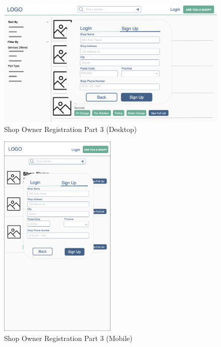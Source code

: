 \documentclass[12pt, titlepage]{article}
\begin{document}
\begin{figure}[H]
	\centering
	\includegraphics[width=\textwidth]{mockups/Shop Owner Signup (Part 2) (Desktop).png}
	\caption{Shop Owner Registration \textemdash{} Part 3 (Desktop)}
\end{figure}

\begin{figure}[H]
	\centering
	\includegraphics[width=0.5\textwidth]{mockups/Shop Owner Signup (Part 2) (Mobile).png}
	\caption{Shop Owner Registration \textemdash{} Part 3 (Mobile)}
\end{figure}
\end{document}

